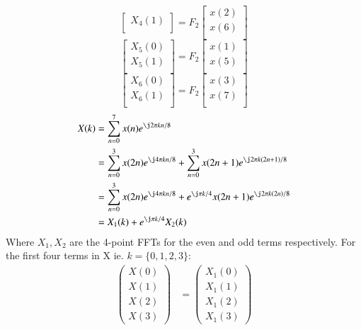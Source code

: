 \documentclass[journal,12pt,twocolumn]{IEEEtran}
\renewcommand\thesection{\arabic{section}}
\begin{document}
\begin{enumerate}[label=\arabic*.,ref=\thesection.\theenumi]
\begin{equation}
\begin{bmatrix}
X_{4}(1)\\ 
\end{bmatrix}
= F_{2}
\begin{bmatrix}
x(2) \\ 
x(6) \\ 
\end{bmatrix}
\end{equation}
\begin{equation}
\begin{bmatrix}
X_{5}(0) \\ 
X_{5}(1)\\ 
\end{bmatrix}
= F_{2}
\begin{bmatrix}
x(1) \\ 
x(5) \\ 
\end{bmatrix}
\end{equation}
\begin{equation}
\begin{bmatrix}
X_{6}(0) \\ 
X_{6}(1)\\ 
\end{bmatrix}
= F_{2}
\begin{bmatrix}
x(3) \\ 
x(7) \\ 
\end{bmatrix}
\end{equation}
\solution
\begin{align}
    X(k) &= \sum_{n=0}^{7}x(n)e^{\j2\pi kn/8}\\
    &= \sum_{n=0}^{3}x(2n)e^{\j4\pi kn/8}+\sum_{n=0}^{3}x(2n+1)e^{\j2\pi k(2n+1)/8}\\
    &= \sum_{n=0}^{3}x(2n)e^{\j4\pi kn/8}+e^{\j\pi k/4}x(2n+1)e^{\j2\pi k(2n)/8}\\
    &= X_1(k) + e^{\j\pi k/4}X_2(k)
\end{align}
Where $X_1, X_2$ are the 4-point FFTs for the even and odd terms respectively. For the first four terms in X ie. $k=\{0,1,2,3\}$:
\begin{align}
    \begin{pmatrix}
    X(0)\\X(1)\\X(2)\\X(3)
    \end{pmatrix}&=
    \begin{pmatrix}
    X_1(0)\\X_1(1)\\X_1(2)\\X_1(3)

\end{pmatrix}
\end{align}
\end{enumerate}
\end{document}
